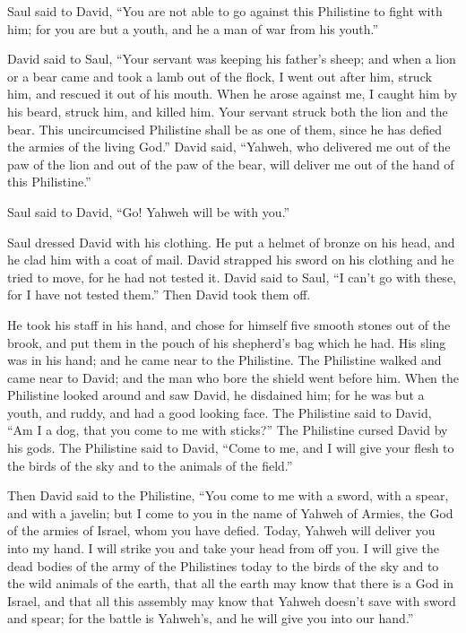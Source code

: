  Saul said to David, ``You are not able to go against
this Philistine to fight with him; for you are but a youth, and he a man
of war from his youth.''

 David said to Saul, ``Your servant was keeping his
father's sheep; and when a lion or a bear came and took a lamb out of
the flock,  I went out after him, struck him, and rescued
it out of his mouth. When he arose against me, I caught him by his
beard, struck him, and killed him.  Your servant struck
both the lion and the bear. This uncircumcised Philistine shall be as
one of them, since he has defied the armies of the living God.''
 David said, ``Yahweh, who delivered me out of the paw of
the lion and out of the paw of the bear, will deliver me out of the hand
of this Philistine.''

Saul said to David, ``Go! Yahweh will be with you.''

 Saul dressed David with his clothing. He put a helmet of
bronze on his head, and he clad him with a coat of mail. 
David strapped his sword on his clothing and he tried to move, for he
had not tested it. David said to Saul, ``I can't go with these, for I
have not tested them.'' Then David took them off.

 He took his staff in his hand, and chose for himself
five smooth stones out of the brook, and put them in the pouch of his
shepherd's bag which he had. His sling was in his hand; and he came near
to the Philistine.  The Philistine walked and came near
to David; and the man who bore the shield went before him.
 When the Philistine looked around and saw David, he
disdained him; for he was but a youth, and ruddy, and had a good looking
face.  The Philistine said to David, ``Am I a dog, that
you come to me with sticks?'' The Philistine cursed David by his gods.
 The Philistine said to David, ``Come to me, and I will
give your flesh to the birds of the sky and to the animals of the
field.''

 Then David said to the Philistine, ``You come to me with
a sword, with a spear, and with a javelin; but I come to you in the name
of Yahweh of Armies, the God of the armies of Israel, whom you have
defied.  Today, Yahweh will deliver you into my hand. I
will strike you and take your head from off you. I will give the dead
bodies of the army of the Philistines today to the birds of the sky and
to the wild animals of the earth, that all the earth may know that there
is a God in Israel,  and that all this assembly may know
that Yahweh doesn't save with sword and spear; for the battle is
Yahweh's, and he will give you into our hand.''

